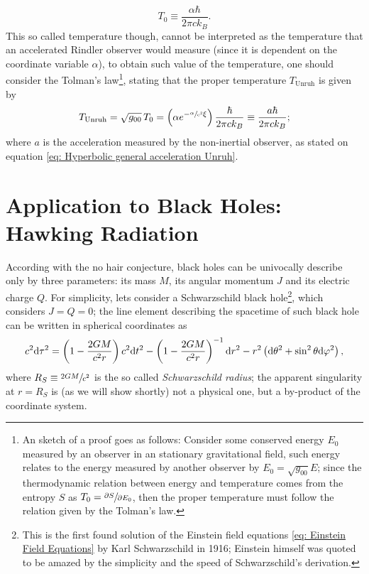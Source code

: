 \begin{equation}\label{eq: Unruh temp_0}
	T_0\equiv \frac{\alpha\hbar}{2\pi ck_B}.
\end{equation}
This so called temperature though, cannot be interpreted as the temperature that an accelerated Rindler observer would measure (since it is dependent on the coordinate variable $\alpha$), to obtain such value of the temperature, one should consider the Tolman's law\footnote{An sketch of a proof goes as follows: Consider some conserved energy $E_0$ measured by an observer in an stationary gravitational field, such energy relates to the energy measured by another observer by $E_0=\sqrt{g_{00}}E$; since the thermodynamic relation between energy and temperature comes from the entropy $S$ as $T_0=\sfrac{\partial S}{\partial E_0}$, then the proper temperature must follow the relation given by the Tolman's law.}, stating that the proper temperature $T_{\text{Unruh}}$ is given by
\begin{equation}
	T_{\text{Unruh}}=\sqrt{g_{00}}\,T_0=\left(\alpha e^{-\sfrac{\alpha}{c^2}\xi}\right)\frac{\hbar}{2\pi ck_B}\equiv \frac{a\hbar}{2\pi ck_B};
\end{equation}
where $a$ is the acceleration measured by the non-inertial observer, as stated on equation \ref{eq: Hyperbolic general acceleration Unruh}.

\section{Application to Black Holes: Hawking Radiation}
According with the no hair conjecture, black holes can be univocally describe only by three parameters: its mass $M$, its angular momentum $J$ and its electric charge $Q$. For simplicity, lets consider a Schwarzschild black hole\footnote{This is the first found solution of the Einstein field equations \ref{eq: Einstein Field Equations} by Karl Schwarzschild in 1916; Einstein himself was quoted to be amazed by the simplicity and the speed of Schwarzschild's derivation.}, which considers $J=Q=0$; the line element describing the spacetime of such black hole \cite{CanoJones} can be written in spherical coordinates as
\begin{equation}\label{eq: Schwarzschild line element}
	c^2\text{d}\tau^2=\left(1-\frac{2GM}{c^2r}\right)c^2\text{d} t^2-\left(1-\frac{2GM}{c^2r}\right)^{-1}\text{d} r^2-r^2\left(\text{d}\theta^2+\sin^2\theta\text{d}\varphi^2\right),
\end{equation}
where $R_S\equiv\sfrac{2GM}{c^2}$ is the so called \textit{Schwarzschild radius}; the apparent singularity at $r=R_S$ is (as we will show shortly) not a physical one, but a by-product of the coordinate system.

